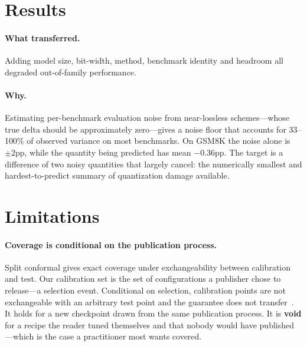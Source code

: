 
\section{Results}

\paragraph{What transferred.} Adding model size, bit-width, method,
benchmark identity and headroom all degraded out-of-family performance.

\paragraph{Why.} Estimating per-benchmark evaluation noise from near-lossless
schemes---whose true delta should be approximately zero---gives a noise floor
that accounts for 33--100\% of observed variance on most benchmarks. On GSM8K
the noise alone is \(\pm 2\)pp, while the quantity being predicted has mean
\(-0.36\)pp. The target is a difference of two noisy quantities that largely
cancel: the numerically smallest and hardest-to-predict summary of quantization
damage available.

\section{Limitations}

\paragraph{Coverage is conditional on the publication process.}
Split conformal gives exact coverage under exchangeability between calibration
and test. Our calibration set is the set of configurations a publisher chose to
release---a selection event. Conditional on selection, calibration points are
not exchangeable with an arbitrary test point and the guarantee does not
transfer~\cite{barber2023beyond,jin2024focal}. It holds for a new checkpoint
drawn from the same publication process. It is \textbf{void} for a recipe the
reader tuned themselves and that nobody would have published---which is the case
a practitioner most wants covered.
